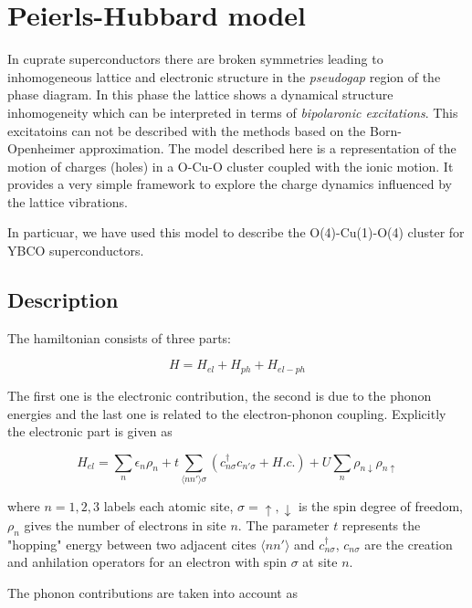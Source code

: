 \chapter{Peierls-Hubbard model}

In cuprate superconductors there are broken symmetries leading to inhomogeneous lattice and electronic structure in the \textit{pseudogap} region of the phase diagram. In this phase the lattice shows a dynamical structure inhomogeneity which can be interpreted in terms of \textit{bipolaronic excitations}. This excitatoins can not be described with the methods based on the Born-Openheimer approximation. The model described here is a representation of the motion of charges (holes) in a O-Cu-O cluster coupled with the ionic motion. It provides a very simple framework to explore the charge dynamics influenced by the lattice vibrations.

In particuar, we have used this model to describe the O(4)-Cu(1)-O(4) cluster for YBCO superconductors.

\section{Description}

The hamiltonian consists of three parts\cite{Salkola1994}:

\begin{equation}\label{full-hamiltonian}H = H_{el} + H_{ph} + H_{el-ph}\end{equation}

The first one is the electronic contribution, the second is due to the phonon energies and the last one is related to the electron-phonon coupling. Explicitly the electronic part is given as

\begin{equation}\label{electronic-part}H_{el} = \sum_n \epsilon_n \rho_n + t\sum_{\langle nn'\rangle\sigma}(c_{n\sigma}^\dagger c_{n'\sigma} + H.c.) + U\sum_n \rho_{n\downarrow}\rho_{n\uparrow}\end{equation}

where $n=1,2,3$ labels each atomic site, $\sigma=\uparrow,\downarrow$ is the spin degree of freedom, $\rho_n$ gives the number of electrons in site $n$. The parameter $t$ represents the "hopping" energy between two adjacent cites $\langle n n'\rangle$ and $c^\dagger_{n\sigma}$, $c_{n\sigma}$ are the creation and anhilation operators for an electron with spin $\sigma$ at site $n$.

The phonon contributions are taken into account as

